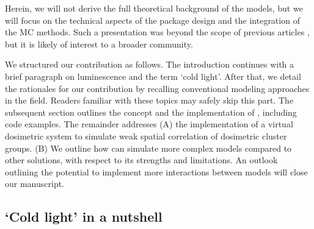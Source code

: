 Herein, we will not derive the full theoretical background of the models,
but we will focus on the technical aspects of the package design and the
integration of the MC methods. Such a presentation was beyond the scope
of previous articles \citep[e.g.,][]{Pagonis:2019hk, Pagonis:2020bt},
but it is likely of interest to a broader community.

We structured our contribution as follows. The introduction continues
with a brief paragraph on luminescence and the term `cold light'. After
that, we detail the rationales for our contribution by recalling
conventional modeling approaches in the field. Readers familiar with
these topics may safely skip this part. The subsequent section outlines
the concept and the implementation of , including
code examples. The remainder addresses (A) the implementation of a
virtual dosimetric system to simulate weak spatial correlation of
dosimetric cluster groups. (B) We outline how  can
simulate more complex models compared to other solutions, with respect
to its strengths and limitations. An outlook outlining the potential to
implement more interactions between models will close our manuscript.

\hypertarget{cold-light-in-a-nutshell}{%
\subsection{`Cold light' in a nutshell}\label{cold-light-in-a-nutshell}}

